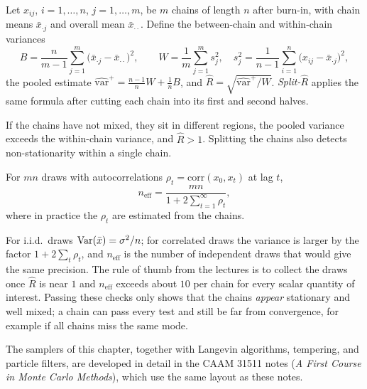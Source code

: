 \begin{definition}\label{def:rhat}
Let $x_{ij}$, $i=1,\dots,n$, $j=1,\dots,m$, be $m$ chains of length $n$ after burn-in, with chain means $\bar x_{\cdot j}$ and overall mean $\bar x_{\cdot\cdot}$. Define the between-chain and within-chain variances
\[
B=\frac n{m-1}\sum_{j=1}^m\big(\bar x_{\cdot j}-\bar x_{\cdot\cdot}\big)^2,\qquad
W=\frac1m\sum_{j=1}^ms_j^2,\quad s_j^2=\frac1{n-1}\sum_{i=1}^n\big(x_{ij}-\bar x_{\cdot j}\big)^2,
\]
the pooled estimate $\widehat{\mathrm{var}}^+=\frac{n-1}nW+\frac1nB$, and $\hat R=\sqrt{\widehat{\mathrm{var}}^+/W}$. \emph{Split-$\hat R$} applies the same formula after cutting each chain into its first and second halves.
\end{definition}

If the chains have not mixed, they sit in different regions, the pooled variance exceeds the within-chain variance, and $\hat R>1$. Splitting the chains also detects non-stationarity within a single chain.

\begin{definition}\label{def:ess}
For $mn$ draws with autocorrelations $\rho_t=\mathrm{corr}(x_0,x_t)$ at lag $t$,
\[
n_{\mathrm{eff}}=\frac{mn}{1+2\sum_{t=1}^\infty\rho_t},
\]
where in practice the $\rho_t$ are estimated from the chains.
\end{definition}

For i.i.d.\ draws $\operatorname{Var}(\bar x)=\sigma^2/n$; for correlated draws the variance is larger by the factor $1+2\sum_t\rho_t$, and $n_{\mathrm{eff}}$ is the number of independent draws that would give the same precision. The rule of thumb from the lectures is to collect the draws once $\hat R$ is near $1$ and $n_{\mathrm{eff}}$ exceeds about $10$ per chain for every scalar quantity of interest. Passing these checks only shows that the chains \emph{appear} stationary and well mixed; a chain can pass every test and still be far from convergence, for example if all chains miss the same mode.

\begin{remark}
The samplers of this chapter, together with Langevin algorithms, tempering, and particle filters, are developed in detail in the CAAM 31511 notes (\emph{A First Course in Monte Carlo Methods}), which use the same layout as these notes.
\end{remark}

